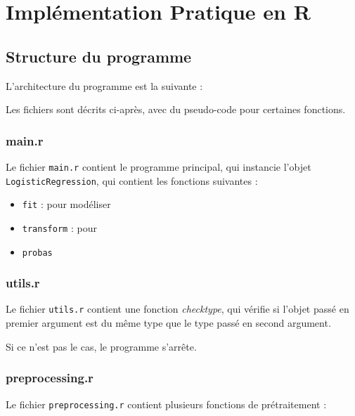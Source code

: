 \documentclass[10pt,french]{report}
\begin{document}
	\chapter{Implémentation Pratique en R}

	\section{Structure du programme}

	L'architecture du programme est la suivante :


	Les fichiers sont décrits ci-après, avec du pseudo-code pour certaines fonctions.

	\subsection{main.r}

	Le fichier \texttt{main.r} contient le programme principal, qui instancie l'objet \texttt{LogisticRegression}, qui contient les fonctions suivantes :

	\begin{itemize}
		\item \texttt{fit} : pour modéliser
		\item \texttt{transform} : pour
		\item \texttt{probas}
	\end{itemize}

	\subsection{utils.r}

	Le fichier \texttt{utils.r} contient une fonction \textit{check\textunderscore type}, qui vérifie si l'objet passé en premier argument est du même type que le type passé en second argument.

	Si ce n'est pas le cas, le programme s'arrête.

	\subsection{preprocessing.r}

	Le fichier \texttt{preprocessing.r} contient plusieurs fonctions de prétraitement :
\end{document}
